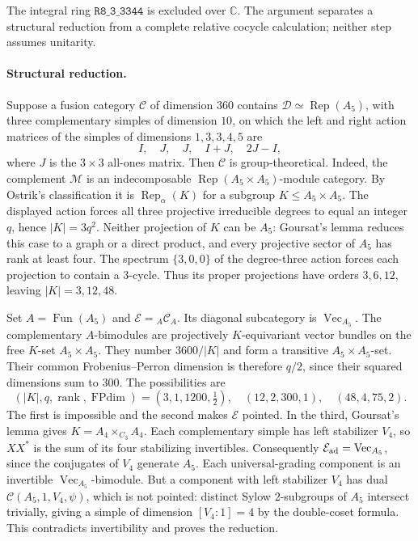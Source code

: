 The integral ring $\mathtt{R8\_3\_3344}$ is excluded over $\mathbb C$.
The argument separates a structural reduction from a complete relative
cocycle calculation; neither step assumes unitarity.

\paragraph{Structural reduction.}
Suppose a fusion category $\mathcal C$ of dimension $360$ contains
$\mathcal D\simeq\operatorname{Rep}(A_5)$, with three complementary
simples of dimension $10$, on which the left and right action matrices
of the simples of dimensions $1,3,3,4,5$ are
\[
 I,\quad J,\quad J,\quad I+J,\quad 2J-I,
\]
where $J$ is the $3\times3$ all-ones matrix. Then $\mathcal C$ is
group-theoretical.
Indeed, the complement $\mathcal M$ is an indecomposable
$\operatorname{Rep}(A_5\times A_5)$-module category. By Ostrik's
classification it is $\operatorname{Rep}_{\alpha}(K)$ for a subgroup
$K\leq A_5\times A_5$. The displayed action forces all three projective
irreducible degrees to equal an integer $q$, hence $|K|=3q^2$.
Neither projection of $K$ can be $A_5$: Goursat's lemma reduces this
case to a graph or a direct product, and every projective sector of
$A_5$ has rank at least four. The spectrum $\{3,0,0\}$ of the degree-three
action forces each projection to contain a $3$-cycle. Thus its proper
projections have orders $3,6,12$, leaving $|K|=3,12,48$.

Set $A=\operatorname{Fun}(A_5)$ and
$\mathcal E={}_A\mathcal C_A$. Its diagonal subcategory is
$\operatorname{Vec}_{A_5}$. The complementary $A$-bimodules are
projectively $K$-equivariant vector bundles on the free $K$-set
$A_5\times A_5$. They number $3600/|K|$ and form a transitive
$A_5\times A_5$-set. Their common Frobenius--Perron dimension is therefore
$q/2$, since their squared dimensions sum to $300$.
The possibilities are
\[
 (|K|,q,\operatorname{rank},\operatorname{FPdim})
 =(3,1,1200,\tfrac12),\quad(12,2,300,1),\quad(48,4,75,2).
\]
The first is impossible and the second makes $\mathcal E$ pointed.
In the third, Goursat's lemma gives
$K=A_4\times_{C_3}A_4$. Each complementary simple has left stabilizer
$V_4$, so $XX^*$ is the sum of its four stabilizing invertibles.
Consequently $\mathcal E_{\rm ad}=\operatorname{Vec}_{A_5}$, since the
conjugates of $V_4$ generate $A_5$.
Each universal-grading component is an invertible
$\operatorname{Vec}_{A_5}$-bimodule. But a component with left stabilizer
$V_4$ has dual $\mathcal C(A_5,1,V_4,\psi)$, which is not pointed:
distinct Sylow $2$-subgroups of $A_5$ intersect trivially, giving a
simple of dimension $[V_4:1]=4$ by the double-coset formula.
This contradicts invertibility and proves the reduction.


